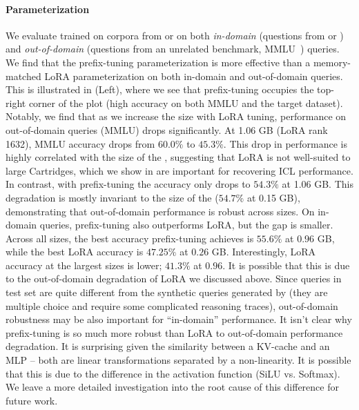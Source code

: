 \paragraph{Parameterization}
We evaluate \artifacts trained on corpora from \longhealth or \qasper on both \textit{in-domain} (\ie questions from \longhealth or \qasper) and \textit{out-of-domain} (\ie questions from an unrelated benchmark, MMLU~\cite{hendrycks2020measuring}) queries.
We find that the prefix-tuning parameterization is more effective than a memory-matched LoRA parameterization on both in-domain and out-of-domain queries.
This is illustrated in  (Left), where we see that prefix-tuning occupies the top-right corner of the plot (high accuracy on both MMLU and the target dataset).
Notably, we find that as we increase the \artifact size with LoRA tuning, performance on out-of-domain queries (MMLU) drops significantly. At 1.06 GB (LoRA rank 1632), MMLU accuracy drops from $60.0\%$ to $45.3\%$.
This drop in performance is highly correlated with the size of the \artifact, suggesting that LoRA is not well-suited to large Cartridges, which we show in  are important for recovering ICL performance.
In contrast, with prefix-tuning the accuracy only drops to $54.3\%$ at 1.06 GB. This degradation is mostly invariant to the size of the \artifact ($54.7\%$ at 0.15 GB), demonstrating that out-of-domain performance is robust across \artifact sizes.
On in-domain queries, prefix-tuning also outperforms LoRA, but the gap is smaller.
Across all \artifact sizes, the best \longhealth accuracy prefix-tuning achieves is $55.6\%$ at $0.96$ GB, while the best LoRA accuracy is $47.25\%$ at $0.26$ GB.
Interestingly, LoRA accuracy at the largest \artifact sizes is lower; $41.3\%$ at $0.96$.
It is possible that this is due to the out-of-domain degradation of LoRA we discussed above.
Since queries in \longhealth test set are quite different from the synthetic queries generated by \method (\eg they are multiple choice and require some complicated reasoning traces), out-of-domain robustness may be also important for ``in-domain'' performance.
It isn't clear why prefix-tuning is so much more robust than LoRA to out-of-domain performance degradation.
It is surprising given the similarity between a KV-cache and an MLP -- both are linear transformations separated by a non-linearity.
It is possible that this is due to the difference in the activation function (SiLU vs. Softmax).
We leave a more detailed investigation into the root cause of this difference for future work.
